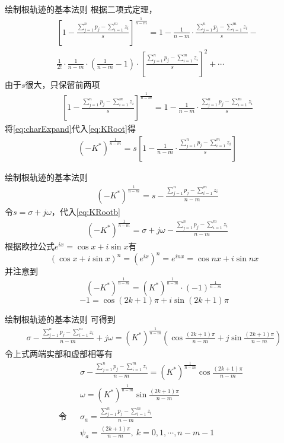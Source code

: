 \documentclass[handout,cjkutf8,table,aspectratio=1610]{beamer} %
\begin{document}
\begin{frame}{绘制根轨迹的基本法则}
	根据二项式定理，
	\begin{align*}
		&\left[1-\frac{\sum_{j=1}^n p_j-\sum_{i=1}^m z_i}{s}\right]^{\frac{1}{n-m}}=1-\frac{1}{n-m}\cdot\frac{\sum_{j=1}^n p_j-\sum_{i=1}^m z_i}{s}-\\
		&\frac{1}{2!}\cdot\frac{1}{n-m}\cdot(\frac{1}{n-m}-1)\cdot\left[\frac{\sum_{j=1}^n p_j-\sum_{i=1}^m z_i}{s}\right]^2+\cdots
	\end{align*}
	由于$s$很大，只保留前两项
	\begin{align}
		&\left[1-\frac{\sum_{j=1}^n p_j-\sum_{i=1}^m z_i}{s}\right]^{\frac{1}{n-m}}=1-\frac{1}{n-m}\cdot\frac{\sum_{j=1}^n p_j-\sum_{i=1}^m z_i}{s}\label{eq:charExpand}
	\end{align}
	将\eqref{eq:charExpand}代入\eqref{eq:KRoot}得
	\begin{align}
		&(-K^*)^{\frac{1}{n-m}}=s\left[1-\frac{1}{n-m}\cdot\frac{\sum_{j=1}^n p_j-\sum_{i=1}^m z_i}{s}\right]
	\end{align}
\end{frame}

\begin{frame}{绘制根轨迹的基本法则}
	\begin{align}
		&(-K^*)^{\frac{1}{n-m}}=s-\frac{\sum_{j=1}^n p_j-\sum_{i=1}^m z_i}{n-m}\label{eq:KRootb}
	\end{align}
	令$s=\sigma+j\omega$，代入\eqref{eq:KRootb}
	\begin{align}
		&(-K^*)^{\frac{1}{n-m}}=\sigma+j\omega-\frac{\sum_{j=1}^n p_j-\sum_{i=1}^m z_i}{n-m}\label{eq:KRootb}
	\end{align}
	根据欧拉公式$e^{ix}=\cos x+i\sin x$有
	$$(\cos x+i\sin x)^n=(e^{ix})^n=e^{inx}=\cos nx+i\sin nx$$
	并注意到
	$$(-K^*)^{\frac{1}{n-m}}=(K^*)^{\frac{1}{n-m}}\cdot(-1)^{\frac{1}{n-m}}$$
	$$-1=\cos(2k+1)\pi+i\sin(2k+1)\pi$$
\end{frame}

\begin{frame}{绘制根轨迹的基本法则}
	可得到
	\begin{align*}
		\sigma-\frac{\sum_{j=1}^n p_j-\sum_{i=1}^m z_i}{n-m}+j\omega=(K^*)^{\frac{1}{n-m}}\left(\cos\frac{(2k+1)\pi}{n-m}+j\sin\frac{(2k+1)\pi}{n-m}\right)
	\end{align*}
	令上式两端实部和虚部相等有
	\begin{align}
		&&\sigma-\frac{\sum_{j=1}^n p_j-\sum_{i=1}^m z_i}{n-m}=(K^*)^{\frac{1}{n-m}}\cos\frac{(2k+1)\pi}{n-m}&\label{eq:realAsy}\\
		&&\omega=(K^*)^{\frac{1}{n-m}}\sin\frac{(2k+1)\pi}{n-m}&\label{eq:imAsy}\\
		\text{令}&&\sigma_a=\frac{\sum_{j=1}^n p_j-\sum_{i=1}^m z_i}{n-m}&\label{eq:sigma_a}\\
		&&\psi_a=\frac{(2k+1)\pi}{n-m},\ k=0,1,\cdots,n-m-1&\label{eq:psi_a}
	\end{align}
\end{frame}
\end{document}
